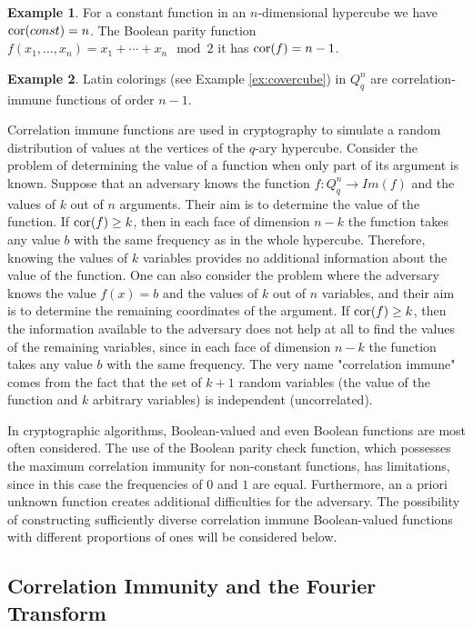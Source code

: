\documentclass[11pt]{article}
\theoremstyle{definition}
\newtheorem{example}{Example}[section]
\newcommand{\cor}{{\rm cor}}
\begin{document}
{{{\begin{example}
For a constant function in an $n$-dimensional hypercube we have  $\cor(const)=n$.
The Boolean parity function $f(x_1,\dots,x_n)=x_1+\cdots+x_n\mod 2$ it has
$\cor(f)=n-1$.
\end{example}

\begin{example}
Latin colorings (see Example \ref{ex:covercube}) in $Q^n_q$ are
correlation-immune functions of order $n-1$.
\end{example}

Correlation immune functions are used in cryptography to
simulate a random distribution of values at the vertices of the $q$-ary
hypercube.
Consider the problem of determining the value of a function when only part of its argument is known.
Suppose that an adversary knows the function
$f:Q^n_q\rightarrow Im(f)$ and the values of $k$ out of $n$ arguments. Their
aim is to determine the value of the function. If
$\cor(f)\geq k$, then in each face of dimension $n-k$ the function
takes any value $b$ with the same frequency as in the whole
hypercube. Therefore, knowing the values of $k$ variables provides no additional information about the value of the function. One can also consider the problem
where the adversary knows the value $f(x)=b$ and
the values of $k$ out of $n$ variables, and their aim is to determine
the remaining coordinates of the argument. If $\cor(f)\geq k$, then the information available to the
adversary does not help at all to find the values of the
remaining variables, since in each face of dimension $n-k$
the function takes any value $b$ with the same frequency.
The very name "correlation immune" comes
from the fact that the set of $k+1$ random variables (the value of the function and $k$
arbitrary variables) is independent (uncorrelated).

In cryptographic algorithms, Boolean-valued and even Boolean functions are most often considered.
The use of the Boolean parity check function, which possesses the maximum correlation immunity for non-constant functions, has limitations, since in this
case the frequencies of $0$ and $1$ are equal. Furthermore, an a priori unknown function
creates additional difficulties for the adversary. The possibility of
constructing sufficiently diverse correlation immune Boolean-valued functions with different proportions of ones will be considered
below.


\subsection{Correlation Immunity and the Fourier Transform}



}}}
\end{document}
